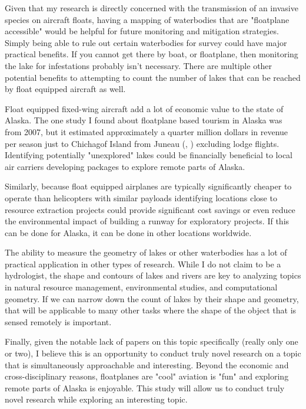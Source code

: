 \documentclass[
    ngerman,american
    ]{scrartcl}
\renewcommand{\cite}[1]{ (\citeauthor{#1}, \citeyear{#1})}
\begin{document}
            Given that my research is directly concerned with the transmission of an invasive species on aircraft floats, having a mapping of waterbodies that are "floatplane accessible" would be helpful for future monitoring and mitigation strategies.  Simply being able to rule out certain waterbodies for survey could have major practical benefits.  If you cannot get there by boat, or floatplane, then monitoring the lake for infestations probably isn't necessary. There are multiple other potential benefits to attempting to count the number of lakes that can be reached by float equipped aircraft as well.

            Float equipped fixed-wing aircraft add a lot of economic value to the state of Alaska.  The one study I found about floatplane based tourism in Alaska was from 2007, but it estimated approximately a quarter million dollars in revenue per season just to Chichagof Island from Juneau \cite{dugan2007nature} excluding lodge flights.  Identifying potentially "unexplored" lakes could be financially beneficial to local air carriers developing packages to explore remote parts of Alaska.
            
            Similarly, because float equipped airplanes are typically significantly cheaper to operate than helicopters with similar payloads identifying locations close to resource extraction projects could provide significant cost savings or even reduce the environmental impact of building a runway for exploratory projects.  If this can be done for Alaska, it can be done in other locations worldwide.

            The ability to measure the geometry of lakes or other waterbodies has a lot of practical application in other types of research.  While I do not claim to be a hydrologist, the shape and contours of lakes and rivers are key to analyzing topics in natural resource management, environmental studies, and computational geometry.  If we can narrow down the count of lakes by their shape and geometry, that will be applicable to many other tasks where the shape of the object that is sensed remotely is important.

            Finally, given the notable lack of papers on this topic specifically (really only one or two), I believe this is an opportunity to conduct truly novel research on a topic that is simultaneously approachable and interesting.  Beyond the economic and cross-disciplinary reasons, floatplanes are "cool" aviation is "fun" and exploring remote parts of Alaska is enjoyable.  This study will allow us to conduct truly novel research while exploring an interesting topic.
\end{document}
